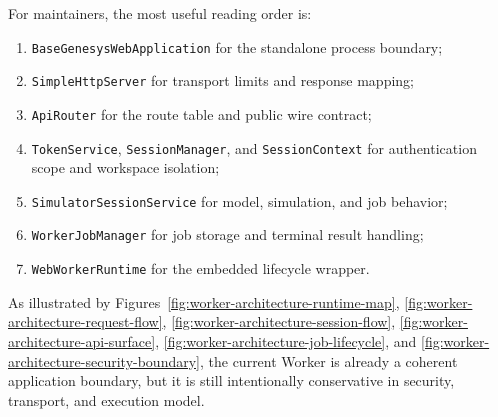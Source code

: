 For maintainers, the most useful reading order is:
\begin{enumerate}
\item \texttt{BaseGenesysWebApplication} for the standalone process boundary;
\item \texttt{SimpleHttpServer} for transport limits and response mapping;
\item \texttt{ApiRouter} for the route table and public wire contract;
\item \texttt{TokenService}, \texttt{SessionManager}, and
      \texttt{SessionContext} for authentication scope and workspace isolation;
\item \texttt{SimulatorSessionService} for model, simulation, and job behavior;
\item \texttt{WorkerJobManager} for job storage and terminal result handling;
\item \texttt{WebWorkerRuntime} for the embedded lifecycle wrapper.
\end{enumerate}

As illustrated by Figures~\ref{fig:worker-architecture-runtime-map},
\ref{fig:worker-architecture-request-flow},
\ref{fig:worker-architecture-session-flow},
\ref{fig:worker-architecture-api-surface},
\ref{fig:worker-architecture-job-lifecycle}, and
\ref{fig:worker-architecture-security-boundary},
the current Worker is already a coherent application boundary, but it is still intentionally conservative in security, transport, and execution model.
